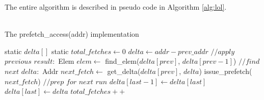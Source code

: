 The entire algorithm is described in pseudo code in Algorithm \ref{alg:lol}. \\\\
\begin{algorithm}
\caption{The prefetch\_access(addr) implementation}
\label{alg:lol}
\begin{algorithmic}
\STATE static $delta[]$
\STATE static $total\_fetches \gets 0$
\STATE $delta \gets addr - prev\_addr$
\STATE
\STATE $//apply$ $previous$ $result:$
\STATE Elem $elem \gets$ find\_elem($delta[prev]$, $delta[prev - 1]$)
\ENDIF
{}
\ELSE
{}
\ENDIF
\ELSE
{}
\ELSE
{}
\ENDIF
\ENDIF
\STATE
\STATE $//find$ $next$ $delta:$
\STATE Addr $next\_fetch \gets$ get\_delta($delta[prev]$, $delta$)
\STATE issue\_prefetch($next\_fetch$)
\ENDIF
\STATE
\STATE $//prep$ $for$ $next$ $run$
\STATE $delta[last - 1] \gets delta[last]$
\STATE $delta[last] \gets delta$
\STATE $total\_fetches++$
\end{algorithmic}
\end{algorithm}


